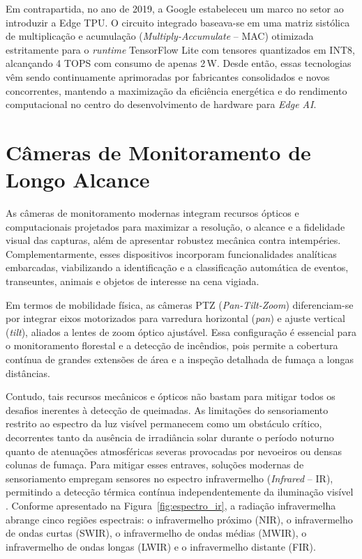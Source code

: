Em contrapartida, no ano de 2019, a Google estabeleceu um marco no setor ao introduzir a Edge TPU. O circuito integrado baseava-se em uma matriz sistólica de multiplicação e acumulação (\textit{Multiply-Accumulate} -- MAC) otimizada estritamente para o \textit{runtime} TensorFlow Lite com tensores quantizados em INT8, alcançando 4 TOPS com consumo de apenas 2\,W. Desde então, essas tecnologias vêm sendo continuamente aprimoradas por fabricantes consolidados e novos concorrentes, mantendo a maximização da eficiência energética e do rendimento computacional no centro do desenvolvimento de hardware para \textit{Edge AI}.

\section{Câmeras de Monitoramento de Longo Alcance}
\label{sec:cameras}

As câmeras de monitoramento modernas integram recursos ópticos e computacionais projetados para maximizar a resolução, o alcance e a fidelidade visual das capturas, além de apresentar robustez mecânica contra intempéries. Complementarmente, esses dispositivos incorporam funcionalidades analíticas embarcadas, viabilizando a identificação e a classificação automática de eventos, transeuntes, animais e objetos de interesse na cena vigiada.

Em termos de mobilidade física, as câmeras PTZ (\textit{Pan-Tilt-Zoom}) diferenciam-se por integrar eixos motorizados para varredura horizontal (\textit{pan}) e ajuste vertical (\textit{tilt}), aliados a lentes de zoom óptico ajustável. Essa configuração é essencial para o monitoramento florestal e a detecção de incêndios, pois permite a cobertura contínua de grandes extensões de área e a inspeção detalhada de fumaça a longas distâncias.

Contudo, tais recursos mecânicos e ópticos não bastam para mitigar todos os desafios inerentes à detecção de queimadas. As limitações do sensoriamento restrito ao espectro da luz visível permanecem como um obstáculo crítico, decorrentes tanto da ausência de irradiância solar durante o período noturno quanto de atenuações atmosféricas severas provocadas por nevoeiros ou densas
colunas de fumaça. Para mitigar esses entraves, soluções modernas de sensoriamento empregam sensores no espectro infravermelho (\textit{Infrared} -- IR), permitindo a detecção térmica contínua independentemente da iluminação visível \cite{driggers2022introduction}. Conforme apresentado na Figura~\ref{fig:espectro_ir}, a radiação infravermelha abrange cinco regiões espectrais: o infravermelho próximo (NIR), o infravermelho de ondas curtas (SWIR), o infravermelho de ondas médias (MWIR), o infravermelho de ondas longas (LWIR) e o infravermelho distante (FIR).

